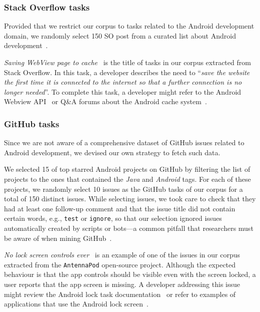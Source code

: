 \subsubsection{Stack Overflow tasks}

Provided that we restrict our corpus to tasks related to the Android development domain,
we randomly select 150 SO post from a curated list about Android development~\cite{baltes2019-rep}.


\textit{Saving WebView page to cache}~\cite{so18607655}
is the title of tasks in our corpus extracted from Stack Overflow. In this task, a developer describes the need
to
``\textit{save the website the first time it is connected to the internet so that a further connection is no longer needed}''.
To complete this task, a developer might refer to the Android Webview API~\cite{apiWebView}
or Q\&A forums about the Android cache system~\cite{so8410830}.


\subsubsection{GitHub tasks}

Since we are not aware of a comprehensive dataset of GitHub issues related to Android development, we devised our own strategy to fetch such data.


We selected 15 of top starred Android projects on GitHub by filtering the list of projects to the ones that contained the \textit{Java} and \textit{Android} tags.
For each of these projects, we randomly select 10 issues as the GitHub tasks of our corpus for a total of 150 distinct issues.
While selecting issues, we took care to check that they had at least one follow-up comment and that the issue title did not contain certain words, e.g., {\small \texttt{test}} or {\small  \texttt{ignore}},
so that our selection ignored issues automatically created by scripts or bots---a common pitfall that researchers must be aware of when mining GitHub~\cite{kalliamvakou2014}.




\textit{No lock screen controls ever}~\cite{git3578}
is an example of one of the issues in our corpus extracted from the \texttt{AntennaPod} open-source project.
Although the expected behaviour is that the app controls should be visible even with the screen locked,  a user reports that the app screen is missing.
A developer addressing this issue might review the Android lock task documentation~\cite{apiLockTask}
or refer to examples of applications that use the Android lock screen~\cite{mediumLockApp}.





